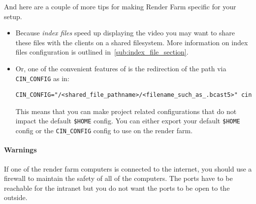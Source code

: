 And here are a couple of more tips for making Render Farm specific
for your setup.
\begin{itemize}
\item Because \textit{index files} speed up displaying the video you
  may want to share these files with the clients on a shared
  filesystem. More information on index files configuration is
  outlined in~\ref{sub:index_file_section}.
\item Or, one of the convenient features of \CGG{} is the
  redirection of the path via \texttt{CIN\_CONFIG} as in:
\begin{lstlisting}[style=sh]
CIN_CONFIG="/<shared_file_pathname>/<filename_such_as_.bcast5>" cin
\end{lstlisting} This means that you can make project related
  configurations that do not impact the default \texttt{\$HOME}
  config.  You can either export your default \texttt{\$HOME} config
  or the \texttt{CIN\_CONFIG} config to use on the render farm.
\end{itemize}

\paragraph{Warnings}

If one of the render farm computers is connected to the internet,
you should use a firewall to maintain the safety of all of the
computers.  The ports have to be reachable for the intranet but you
do not want the ports to be open to the outside.

